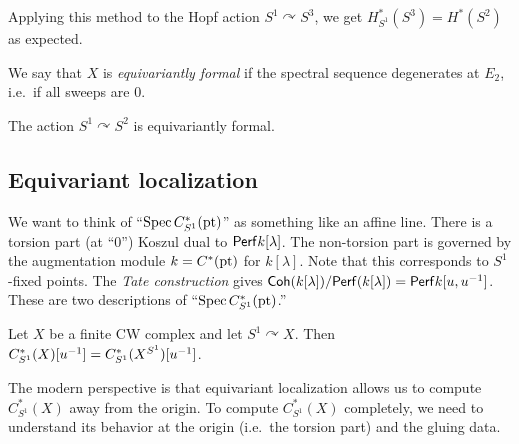 \documentclass{article}
\begin{document}
\begin{ex}
  Applying this method to the Hopf action $S^1 \curvearrowright S^3$, we get $H^*_{S^1}(S^3) = H^*(S^2)$ as expected.
\end{ex}

We say that $X$ is \emph{equivariantly formal} if the spectral sequence degenerates at $E_2$, i.e.\ if all sweeps are $0$.

\begin{ex}
  The action $S^1 \curvearrowright S^2$ is equivariantly formal.
\end{ex}

\subsection{Equivariant localization}

We want to think of ``$\operatorname{Spec} C^*_{S^1}(\operatorname{pt})$'' as something like an affine line.
There is a torsion part (at ``$0$'') Koszul dual to $\mathsf{Perf} k[\lambda]$.
The non-torsion part is governed by the augmentation module $k = C^*(\operatorname{pt})$ for $k[\lambda]$.
Note that this corresponds to $S^1$-fixed points.
The \emph{Tate construction} gives $\mathsf{Coh}(k[\lambda]) / \mathsf{Perf}(k[\lambda]) = \mathsf{Perf} k[u, u^{-1}]$.
These are two descriptions of ``$\operatorname{Spec} C^*_{S^1}(\operatorname{pt})$.''

\begin{thm}
  Let $X$ be a finite CW complex and let $S^1 \curvearrowright X$.
  Then $C^*_{S^1}(X)[u^{-1}] = C^*_{S^1}(X^{S^1})[u^{-1}]$.
\end{thm}

The modern perspective is that equivariant localization allows us to compute $C^*_{S^1}(X)$ away from the origin.
To compute $C^*_{S^1}(X)$ completely, we need to understand its behavior at the origin (i.e.\ the torsion part) and the gluing data.
\end{document}
